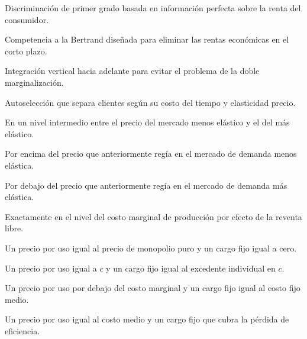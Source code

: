 \begin{opts}
    \item Discriminación de primer grado basada en información perfecta sobre la renta del consumidor.
    \item Competencia a la Bertrand diseñada para eliminar las rentas económicas en el corto plazo.
    \item Integración vertical hacia adelante para evitar el problema de la doble marginalización.
    \item Autoselección que separa clientes según su costo del tiempo y elasticidad precio.
\end{opts}

\begin{opts}
    \item En un nivel intermedio entre el precio del mercado menos elástico y el del más elástico.
    \item Por encima del precio que anteriormente regía en el mercado de demanda menos elástica.
    \item Por debajo del precio que anteriormente regía en el mercado de demanda más elástica.
    \item Exactamente en el nivel del costo marginal de producción por efecto de la reventa libre.
\end{opts}

\begin{opts}
    \item Un precio por uso igual al precio de monopolio puro y un cargo fijo igual a cero.
    \item Un precio por uso igual a $c$ y un cargo fijo igual al excedente individual en $c$.
    \item Un precio por uso por debajo del costo marginal y un cargo fijo igual al costo fijo medio.
    \item Un precio por uso igual al costo medio y un cargo fijo que cubra la pérdida de eficiencia.
\end{opts}

